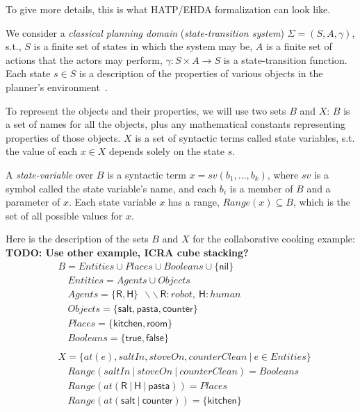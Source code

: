To give more details, this is what HATP/EHDA formalization can look like.

We consider a \textit{classical planning domain} (\textit{state-transition system}) $\Sigma = (S,A,\gamma)$, s.t., $S$ is a finite set of states in which the system may be, $A$ is a finite set of actions that the actors may perform, $\gamma : S \times A \rightarrow S$ is a state-transition function. Each state $s \in S$ is a description of the properties of various objects in the planner's environment~\cite{naubooks0014222}. 

To represent the objects and their properties, we will use two sets $B$ and $X$: $B$ is a set of names for all the objects, plus any mathematical constants representing properties of those objects. $X$ is a set of syntactic terms called state variables, s.t. the value of each $x \in X$ depends solely on the state $s$.

A \textit{state-variable} over $B$ is a syntactic term $x = sv(b_1, ..., b_k)$, where $sv$ is a symbol called the state variable's name, and each $b_i$ is a member of $B$ and a parameter of $x$. Each state variable $x$ has a range, $\textit{Range}(x) \subseteq B$, which is the set of all possible values for $x$.



Here is the description of the sets $B$ and $X$ for the collaborative cooking example:
\textbf{TODO: Use other example, ICRA cube stacking?}
{\small
\begin{align*}
&B           = Entities \cup Places \cup Booleans \cup \{\textsf{nil}\} \\
&\quad Entities    = Agents \cup Objects\\
&\quad Agents      = \{ \textsf{R}, \textsf{H} \} ~~ \backslash\backslash~\textsf{R}:robot,~\textsf{H}:human\\
&\quad Objects     = \{ \textsf{salt}, \textsf{pasta}, \textsf{counter} \}\\
&\quad Places      = \{ \textsf{kitchen}, \textsf{room} \}\\
&\quad Booleans    = \{ \textsf{true},\textsf{false} \}\\
&\\
&X = \{ at(e), saltIn, stoveOn, counterClean ~ | ~ e \in Entities \}\\
&\quad \textit{Range}(saltIn ~|~ stoveOn ~|~ counterClean)=Booleans\\
&\quad \textit{Range}(at(\textsf{R} ~|~ \textsf{H} ~|~ \textsf{pasta})) = Places\\
&\quad \textit{Range}(at(\textsf{salt} ~|~ \textsf{counter})) = \{ \textsf{kitchen} \}
\end{align*}
}

